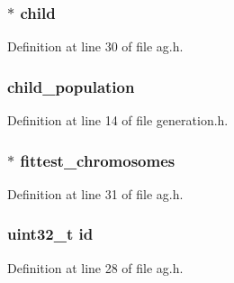 \subsubsection[{child}]{$\ast$ child}\label{structgeneration_a4d5ee8e626a65f74dcc1bb8707bb708e}


Definition at line 30 of file ag.\+h.

\hypertarget{structgeneration_a01e979b992227c4a9a99454e0af2a9f0}{}
\subsubsection[{child\+\_\+population}]{ child\+\_\+population}\label{structgeneration_a01e979b992227c4a9a99454e0af2a9f0}


Definition at line 14 of file generation.\+h.

\hypertarget{structgeneration_af61e34a2810f247dc75359b91c94f0a1}{}
\subsubsection[{fittest\+\_\+chromosomes}]{$\ast$ fittest\+\_\+chromosomes}\label{structgeneration_af61e34a2810f247dc75359b91c94f0a1}


Definition at line 31 of file ag.\+h.

\hypertarget{structgeneration_abaabdc509cdaba7df9f56c6c76f3ae19}{}
\subsubsection[{id}]{\setlength{\rightskip}{0pt plus 5cm}uint32\+\_\+t id}\label{structgeneration_abaabdc509cdaba7df9f56c6c76f3ae19}


Definition at line 28 of file ag.\+h.

\hypertarget{structgeneration_ad06847c56015bc8869688d186d511430}{}
